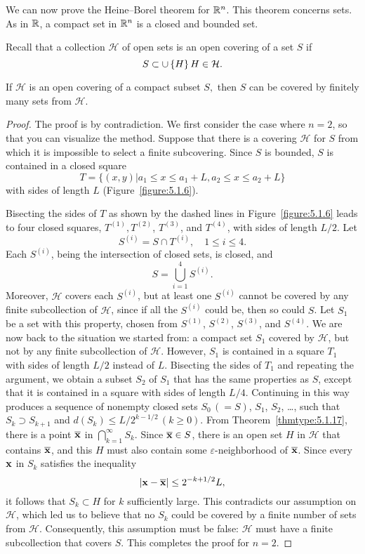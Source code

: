 We can now prove the Heine--Borel theorem for $\mathbb{R}^n$. This
theorem
concerns  sets. As in $\mathbb{R}$, a compact set in
$\mathbb{R}^n$ is a  closed and bounded set.

Recall that
a collection  ${\mathcal H}$  of open sets is an open covering of a set
$S$ if
$$
S\subset\cup\set{H}{ H\in {\mathcal H}}.
$$


\begin{thm} \label{thmtype:5.1.18}
If ${\mathcal H}$ is an open covering of a compact subset $S,$
 then $S$ can be covered
by finitely many sets from ${\mathcal H}.$
\end{thm}

\begin{proof}
The proof is by contradiction. We first consider the case where
$n=2$, so that you can  visualize  the method. Suppose that
there is a covering
${\mathcal H}$ for $S$ from which it is impossible to select a finite
subcovering. Since $S$ is bounded, $S$ is contained in a closed square
$$
T=\{(x,y)|a_1\le x\le a_1+L, a_2\le x\le a_2+L\}
$$
with sides of length $L$ (Figure~\ref{figure:5.1.6}).


Bisecting the sides
of $T$ as shown by the dashed lines in Figure~\ref{figure:5.1.6} leads to
four closed squares, $T^{(1)}, T^{(2)}$, $T^{(3)}$, and $T^{(4)}$,
with sides of length $L/2$. Let
$$
S^{(i)}=S\cap T^{(i)},\quad 1\le i\le4.
$$
Each $S^{(i)}$, being the intersection of closed sets, is closed, and
$$
S=\bigcup^4_{i=1} S^{(i)}.
$$
Moreover, ${\mathcal H}$ covers each $S^{(i)}$, but at least one $S^{(i)}$
cannot be covered by any finite subcollection of ${\mathcal H}$, since if all
the $S^{(i)}$ could be, then so could $S$. Let $S_1$ be a set with
this property, chosen from $S^{(1)}$, $S^{(2)}$, $S^{(3)}$, and
$S^{(4)}$. We are now back to the situation we started from: a
compact set $S_1$ covered by ${\mathcal H}$, but not by any finite
subcollection of ${\mathcal H}$. However, $S_1$ is contained in
a square
$T_1$ with sides of length $L/2$ instead of $L$. Bisecting the sides
of $T_1$ and repeating the argument, we obtain a subset $S_2$ of $S_1$
that has the same properties as $S$, except that it is contained in a
square with sides of length $L/4$. Continuing in this way produces a
sequence of nonempty closed sets $S_0\,(=S)$, $S_1$, $S_2$, \dots,
such
that $S_k\supset S_{k+1}$ and $d(S_k)\le L/2^{k-1/2}\,(k\ge0)$.
From Theorem~\ref{thmtype:5.1.17}, there is a point $\overline{\mathbf{ x}}$ in
$\bigcap^\infty_{k=1}S_k$. Since $\overline{\mathbf{ x}}\in S$, there is an
open set $H$ in ${\mathcal H}$ that contains $\overline{\mathbf{ x}}$, and
this $H$ must also contain some $\varepsilon$-neighborhood of
$\overline{\mathbf{ x}}$. Since every $\mathbf{ x}$ in $S_k$ satisfies
the inequality
$$
|\mathbf{ x}-\overline{\mathbf{ x}}|\le2^{-k+1/2}L,
$$
it follows that $S_k\subset H$ for $k$ sufficiently large. This
contradicts our assumption on ${\mathcal H}$, which led us to believe that
no $S_k$ could be covered by a finite number of sets from ${\mathcal H}$.
Consequently, this assumption must be false: ${\mathcal H}$ must have a
finite subcollection that covers $S$. This completes the proof for $n=2$.



\end{proof}
